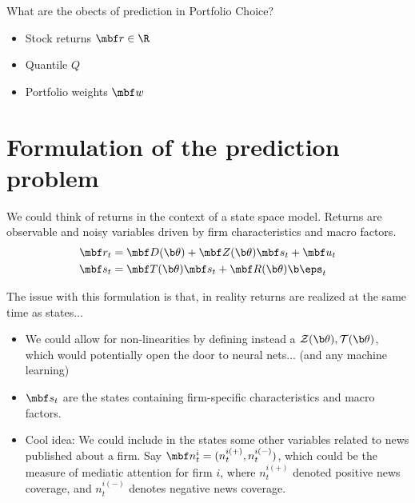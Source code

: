 \documentclass[12pt,article]{memoir}
\begin{document}
What are the obects of prediction in Portfolio Choice?
\begin{itemize}
  \item Stock returns $\mbf r \in \R$
  \item Quantile $Q$
  \item Portfolio weights $\mbf w$
\end{itemize}

\chapter{Formulation of the prediction problem}

We could think of returns in the context of a state space model. Returns are observable and noisy variables driven by firm characteristics and macro factors. 
\begin{align*}
\mbf r_t &= \mbf D(\b \theta) + \mbf Z(\b \theta)\mbf s_t + \mbf u_t
\\
\mbf s_t &= \mbf T(\b \theta)\mbf s_t + \mbf R(\b \theta) \b \eps_t
\end{align*}

The issue with this formulation is that, in reality returns are realized at the same time as states...

\begin{itemize}
  \item We could allow for non-linearities by defining instead a $\mathcal Z(\b \theta ), \mathcal T(\b \theta)$, which would potentially open the door to neural nets... (and any machine learning)
  \item $\mbf s_t$ are the states containing firm-specific characteristics and macro factors. 
  \item Cool idea: We could include in the states some other variables related to news published about a firm. Say $\mbf n_t^i=(n_t^{i(+)},n_t^{i(-)})$, which could be the measure of mediatic attention for firm $i$, where $n_t^{i(+)}$ denoted positive news coverage, and $n_t^{i(-)}$ denotes negative news coverage.
\end{itemize}
\end{document}
